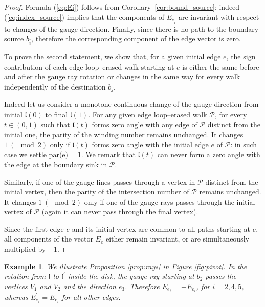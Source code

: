 \documentclass[11pt]{amsart}
\theoremstyle{plain}
\numberwithin{equation}{section}
\newtheorem{example}{Example}[subsection]
\begin{document}
\begin{proof}
Formula (\ref{eq:Ei}) follows from Corollary~\ref{cor:bound_source}: indeed (\ref{eq:index_source}) implies that the components of $E_{e_{\bar i}}$ are invariant with 
respect to changes of the gauge direction. Finally, since there is no path to the boundary source $b_{\bar i}$, therefore the corresponding component of the edge vector is zero. 

To prove the second statement, we show that, for a given initial edge $e$, the sign contribution of each edge loop--erased walk starting at $e$ is either the same before and after the gauge ray rotation or changes in the same way for every walk independently of the destination $b_j$.

Indeed let us consider a monotone continuous change of the gauge direction from initial $\mathfrak l(0)$ to final $\mathfrak l(1)$. For any given edge loop--erased walk $\mathcal P$, for every $t\in(0,1)$  such that  $\mathfrak l(t)$ forms zero angle with any edge of $\mathcal P$ distinct from the initial one, the parity of the  winding number remains unchanged. It changes  $1\  (\!\!\!\!\mod 2)$ only if  $\mathfrak l(t)$ forms zero angle with the initial edge $e$ of $\mathcal P$: in such case we settle $\mbox{par(e)}=1$. We remark that $\mathfrak l(t)$ can never form a zero angle with the edge at the boundary sink in $\mathcal P$. 

Similarly, if one of the gauge lines passes through a vertex in $\mathcal P$ distinct from the initial vertex, then the parity of the intersection number of $\mathcal P$ remains unchanged. It changes  $1\  (\!\!\!\!\mod 2)$ only if one of the gauge rays passes through the initial vertex of $\mathcal P$ (again it can never pass through the final vertex).    

Since the first edge $e$ and its initial vertex are common to all paths starting at $e$, all components of the 
vector $E_e$ either remain invariant, or are simultaneously multiplied by $-1$.
\end{proof}

\begin{example}
We illustrate Proposition \ref{prop:rays} in Figure \ref{fig:pivot}. In the rotation from $\mathfrak{l}$ to $\mathfrak{l}^{\prime}$ inside the disk, the gauge ray starting at $b_2$ passes the vertices $V_1$ and $V_2$ and the direction $e_3$. Therefore
$E^{\prime}_{e_i} = - E_{e_i}$, for $i=2,4,5$, whereas $E^{\prime}_{e_i} = E_{e_i}$ for all other edges.
\end{example}
\end{document}
